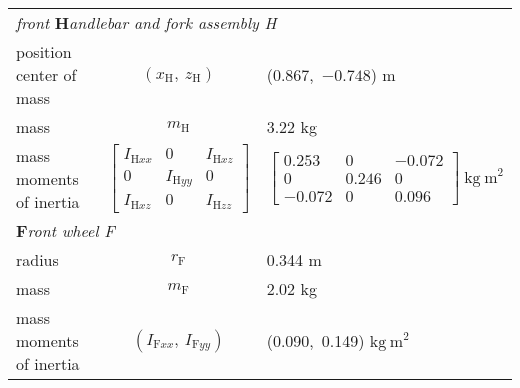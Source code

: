 \documentclass{bmd2010a}
\begin{document}
\begin{table*}[tb]
{\begin{tabular}{lcl}
\multicolumn{3}{l}{\emph{front} \textbf{H}\emph{andlebar and fork assembly H}}\\
position center of mass & \emph{$(x_\mathrm{H},\ z_\mathrm{H})$} &
($0.867$,\ $-0.748$) m\\
mass & \emph{$m_\mathrm{H}$} & 3.22 kg \\
mass moments of inertia & $\left[ \begin{array}{ccc}
I_{\mathrm{H}xx} &  0 & I_{\mathrm{H}xz}\\
0 & I_{\mathrm{H}yy} & 0 \\
I_{\mathrm{H}xz} & 0 & I_{\mathrm{H}zz}
\end{array} \right] $ &
$\left[ \begin{array}{ccc}
    0.253  &       0  & -0.072\\
         0  & 0.246   &  0\\
   -0.072  &       0  &  0.096
\end{array} \right] \ \mathrm{kg\ m}^{2}$\\

\multicolumn{3}{l}{\textbf{F}\emph{ront wheel F}}\\
radius & \emph{$r_\mathrm{F}$} & 0.344 m\\
mass & \emph{$m_\mathrm{F}$} & 2.02 kg \\
mass moments of inertia & \emph{$(I_{\mathrm{F}xx},\
I_{\mathrm{F}yy})$} &
(0.090,\ 0.149) $\mathrm{kg\ m}^2$ \\
\hline
\end{tabular}
}
\label{tab:par}
\end{table*}



\end{document}

